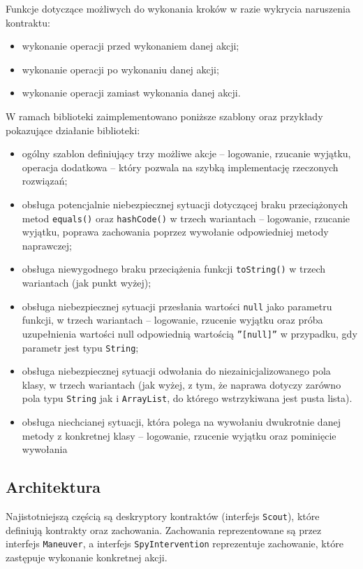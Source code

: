 \documentclass[12pt,a4paper,titlepage]{article}
\begin{document}
    Funkcje dotyczące możliwych do wykonania kroków w razie wykrycia naruszenia kontraktu:
    \begin{itemize}
     \item wykonanie operacji przed wykonaniem danej akcji;
     \item wykonanie operacji po wykonaniu danej akcji;
     \item wykonanie operacji zamiast wykonania danej akcji.
    \end{itemize}
    
    W ramach biblioteki zaimplementowano poniższe szablony oraz przykłady pokazujące działanie biblioteki:
    \begin{itemize}
     \item ogólny szablon definiujący trzy możliwe akcje -- logowanie, rzucanie wyjątku, operacja dodatkowa -- który pozwala na szybką implementację rzeczonych rozwiązań;
     \item obsługa potencjalnie niebezpiecznej sytuacji dotyczącej braku przeciążonych metod \texttt{equals()} oraz \texttt{hashCode()} w trzech wariantach -- logowanie, rzucanie wyjątku, poprawa zachowania poprzez wywołanie odpowiedniej metody naprawczej;
     \item obsługa niewygodnego braku przeciążenia funkcji \texttt{toString()} w trzech wariantach (jak punkt wyżej);
     \item obsługa niebezpiecznej sytuacji przesłania wartości \texttt{null} jako parametru funkcji, w trzech wariantach -- logowanie, rzucenie wyjątku oraz próba uzupełnienia wartości null odpowiednią wartością \texttt{''[null]''} w przypadku, gdy parametr jest typu \texttt{String};
     \item obsługa niebezpiecznej sytuacji odwołania do niezainicjalizowanego pola klasy, w trzech wariantach (jak wyżej, z tym, że naprawa dotyczy zarówno pola typu \texttt{String} jak i \texttt{ArrayList}, do którego wstrzykiwana jest pusta lista).
     \item obsługa niechcianej sytuacji, która polega na wywołaniu dwukrotnie danej metody z konkretnej klasy -- logowanie, rzucenie wyjątku oraz pominięcie wywołania
    \end{itemize}
    
  \subsection{Architektura}
   Najistotniejszą częścią są deskryptory kontraktów (interfejs \texttt{Scout}), które definiują kontrakty oraz zachowania. Zachowania reprezentowane są przez interfejs \texttt{Maneuver}, a interfejs \texttt{SpyIntervention} reprezentuje zachowanie, które zastępuje wykonanie konkretnej akcji.
   
\end{document}
